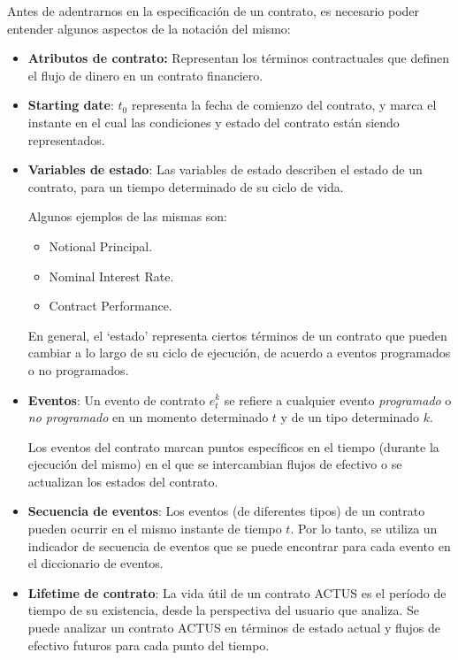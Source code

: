 \documentclass{beamer}
\begin{document}
\begin{frame}
Antes de adentrarnos en la especificación de un contrato, es necesario poder entender algunos
aspectos de la notación del mismo: \pause
\medskip

\begin{itemize}
    \item \textbf{Atributos de contrato:} Representan los términos contractuales que definen el flujo de dinero en un contrato financiero.
    \pause
    \item \textbf{Starting date}: $t_0$ representa la fecha de comienzo del contrato, y marca el instante en el cual las condiciones y estado del contrato están siendo representados. 
    \pause
    \item \textbf{Variables de estado}: Las variables de estado describen el estado de un contrato, para un tiempo determinado de su ciclo de vida. 

        Algunos ejemplos de las mismas son: 
        \pause
            \begin{itemize}
                \item Notional Principal.
                \item Nominal Interest Rate.
                \item Contract Performance.
            \end{itemize}
        \pause
        En general, el ‘estado’ representa ciertos términos de un contrato que pueden cambiar a lo largo de su ciclo de ejecución, de acuerdo a eventos programados o no programados. 
\end{itemize}

\end{frame}

\begin{frame}
    \begin{itemize}
        \item \textbf{Eventos}: Un evento de contrato $e_t^k$ se refiere a cualquier evento \textit{programado} o \textit{no programado} en un momento determinado $t$ y de un tipo determinado $k$. 

        Los eventos del contrato marcan puntos específicos en el tiempo (durante la ejecución del mismo) en el que se intercambian flujos de efectivo o se actualizan los estados del contrato. 
        \pause

        \item \textbf{Secuencia de eventos}: Los eventos (de diferentes tipos) de un contrato pueden ocurrir en el mismo instante de tiempo $t$.
        Por lo tanto, se utiliza un indicador de secuencia de eventos que se puede encontrar para cada evento en el diccionario de eventos.
    \pause
        \item \textbf{Lifetime de contrato}: La vida útil de un contrato ACTUS es el período de tiempo de su existencia, desde la perspectiva del usuario que analiza. Se puede analizar un contrato ACTUS en términos de estado actual y flujos de efectivo futuros para cada punto del tiempo. 
    \end{itemize}
\end{frame}
\end{document}
